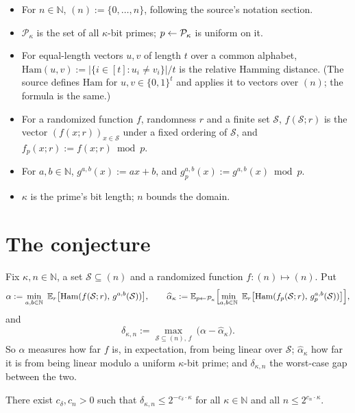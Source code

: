 \documentclass{aicr-conjecture}
\newcommand{\N}{\mathbb{N}}
\newcommand{\Ham}{\mathrm{Ham}}
\newcommand{\Prm}{\mathcal{P}}
\newcommand{\Sc}{\mathcal{S}}
\begin{document}
\begin{itemize}[nosep]
  \item For $n \in \N$, $(n) := \{0, \dots, n\}$, following the source's
    notation section.
  \item $\Prm_{\kappa}$ is the set of all $\kappa$-bit primes; $p
    \sample \Prm_{\kappa}$ is uniform on it.
  \item For equal-length vectors $u, v$ of length $t$ over a common
    alphabet, $\Ham(u,v) := |\{i \in [t] : u_{i} \ne v_{i}\}| / t$ is
    the relative Hamming distance. (The source defines $\Ham$ for $u, v
    \in \{0,1\}^{t}$ and applies it to vectors over $(n)$; the formula is
    the same.)
  \item For a randomized function $f$, randomness $r$ and a finite set
    $\Sc$, $f(\Sc; r)$ is the vector $(f(x;r))_{x \in \Sc}$ under a fixed
    ordering of $\Sc$, and $f_{p}(x;r) := f(x;r) \bmod p$.
  \item For $a, b \in \N$, $g^{a,b}(x) := ax + b$, and $g^{a,b}_{p}(x) :=
    g^{a,b}(x) \bmod p$.
  \item $\kappa$ is the prime's bit length; $n$ bounds the domain.
\end{itemize}

\section{The conjecture}\label{sec:conjectures}

\begin{definition}\label{def:distance}
Fix $\kappa, n \in \N$, a set $\Sc \subseteq (n)$ and a randomized
function $f : (n) \mapsto (n)$. Put
\[
  \alpha := \min_{a,b \in \N}\ \mathbb{E}_{r}\bigl[
    \Ham(f(\Sc;r),\, g^{a,b}(\Sc)) \bigr],
  \qquad
  \widehat{\alpha}_{\kappa} := \mathbb{E}_{p \sample \Prm_{\kappa}}
    \Bigl[ \min_{a,b \in \N}\ \mathbb{E}_{r}\bigl[
    \Ham(f_{p}(\Sc;r),\, g^{a,b}_{p}(\Sc)) \bigr] \Bigr],
\]
and
\[
  \delta_{\kappa,n} := \max_{\Sc \subseteq (n),\, f}\
  \bigl( \alpha - \widehat{\alpha}_{\kappa} \bigr).
\]
So $\alpha$ measures how far $f$ is, in expectation, from being linear
over $\Sc$; $\widehat{\alpha}_{\kappa}$ how far it is from being linear
modulo a uniform $\kappa$-bit prime; and $\delta_{\kappa,n}$ the
worst-case gap between the two.
\end{definition}

\begin{conjecture}\label{conj:main}
There exist $c_{\delta}, c_{n} > 0$ such that $\delta_{\kappa,n} \le
2^{-c_{\delta} \cdot \kappa}$ for all $\kappa \in \N$ and all $n \le
2^{c_{n} \cdot \kappa}$.
\end{conjecture}
\end{document}
